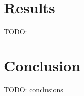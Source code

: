 \documentclass[12pt]{article}
\begin{document}
\pagebreak
\section{Results}
TODO: 



\pagebreak
\section{Conclusion}
TODO: conclusions


\pagebreak
\begin{thebibliography}{}






\end{thebibliography}

\pagebreak
\end{document}
